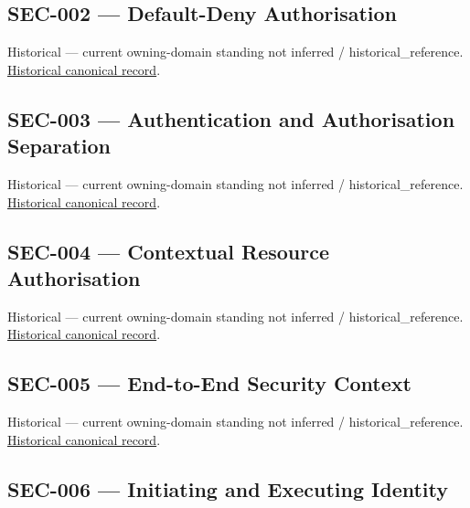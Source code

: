 \subsection{SEC-002 — Default-Deny Authorisation}

\par\label{element:3bdecb66e3f34110aa0871ba34091bfd}
Historical — current owning-domain standing not inferred / historical\_reference. \href{../../../../continuum/motivation/requirement/3bdecb66e3f34110aa0871ba34091bfd.md}{Historical canonical record}.\par

\subsection{SEC-003 — Authentication and Authorisation Separation}

\par\label{element:88f2ace9a07d4ed7b5a54a4af93af3c9}
Historical — current owning-domain standing not inferred / historical\_reference. \href{../../../../continuum/motivation/requirement/88f2ace9a07d4ed7b5a54a4af93af3c9.md}{Historical canonical record}.\par

\subsection{SEC-004 — Contextual Resource Authorisation}

\par\label{element:1f6822aef4bc44548c6708fcc018e4ba}
Historical — current owning-domain standing not inferred / historical\_reference. \href{../../../../continuum/motivation/requirement/1f6822aef4bc44548c6708fcc018e4ba.md}{Historical canonical record}.\par

\subsection{SEC-005 — End-to-End Security Context}

\par\label{element:d70e0a51440640b1bd17562b6ea4ff98}
Historical — current owning-domain standing not inferred / historical\_reference. \href{../../../../continuum/motivation/requirement/d70e0a51440640b1bd17562b6ea4ff98.md}{Historical canonical record}.\par

\subsection{SEC-006 — Initiating and Executing Identity}

